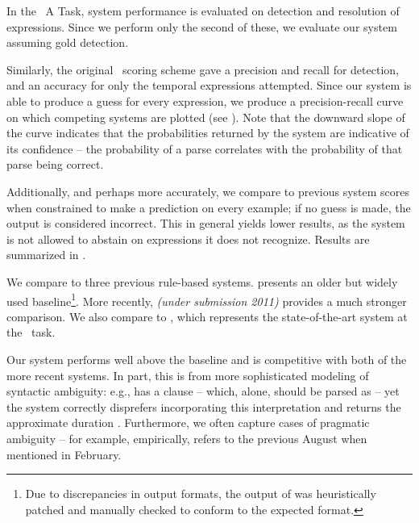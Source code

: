 In the \tempeval\ A Task, system performance is evaluated on 
	detection and resolution of expressions.
Since we perform only the second of these, we evaluate our system
	assuming gold detection.


Similarly, the original \tempeval\ scoring scheme gave a precision 
	and recall for detection, and an accuracy for only the temporal expressions 
	attempted.
Since our system is able to produce a guess for every expression, we produce
	a precision-recall curve on which competing systems are plotted
	(see ).
Note that the downward slope of the curve indicates that the probabilities
	returned by the system are indicative of its confidence -- the probability
	of a parse correlates with the probability of that parse being correct.

Additionally, and perhaps more accurately, we compare to 
	previous system scores when constrained to make a prediction on every
	example; if no guess is made, the output is considered incorrect.
This in general yields lower results, as the system is not allowed to
	abstain on expressions it does not recognize.
Results are summarized in .

We compare to three previous rule-based systems.
 \cite{key:2000mani-temporal} presents an older but widely
	used baseline\footnote{
		Due to discrepancies in output formats, 
			the output of  was heuristically patched
			and manually checked to conform to the expected format.
	}.
More recently,  \textit{(under submission 2011)} 
	provides a much stronger comparison.
We also compare to  \cite{key:2010strotgen-temporal}, 
	which represents the state-of-the-art system at the \tempeval\ task.

Our system performs well above the  baseline and is competitive
	with both of the more recent systems.
In part, this is from more sophisticated modeling of syntactic ambiguity:
	e.g.,  has a clause  -- which, alone,
	should be parsed as  -- yet the system correctly disprefers
	incorporating this interpretation and 
	returns the approximate duration .
Furthermore, we often capture cases of pragmatic ambiguity -- for example,
	empirically,  refers to the previous August when mentioned in
	February.



